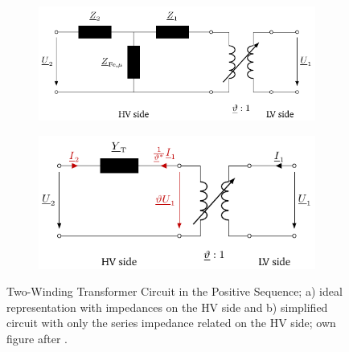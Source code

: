 \begin{figure}%
    \centering
    \begin{subfigure}[c]{.53\textwidth}
        \centering
        \includegraphics[width=\linewidth]{tikz_graphics/images/transformer_complete.pdf}
    \end{subfigure}
    \begin{subfigure}[c]{.46\textwidth}
        \centering
        \includegraphics[width=\linewidth]{tikz_graphics/images/transformer_reduced.pdf}
    \end{subfigure}
    \caption[Two-Winding Transformer Circuit in the Positive Sequence]{Two-Winding Transformer Circuit in the Positive Sequence; a) ideal representation with impedances on the \acs{HV} side and b) simplified circuit with only the series impedance related on the \acs{HV} side; own figure after \autocite{machowski_2020,kundur_2022,milano_2010}.}
    \label{fig:trafo-model}
\end{figure}

